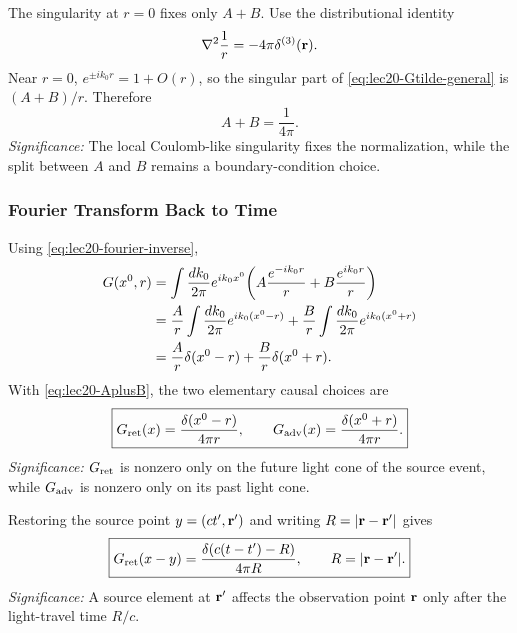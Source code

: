 The singularity at $r=0$ fixes only $A+B$. Use the distributional identity
\begin{equation}\label{eq:lec20-laplacian-one-over-r}
  \nabla^2\frac{1}{r}=-4\pi\delta^{(3)}(\mathbf{r}).
\end{equation}
Near $r=0$, $e^{\pm ik_0r}=1+O(r)$, so the singular part of \eqref{eq:lec20-Gtilde-general} is
$(A+B)/r$. Therefore
\begin{equation}\label{eq:lec20-AplusB}
  \boxed{A+B=\frac{1}{4\pi}.}
\end{equation}
\textit{Significance:} The local Coulomb-like singularity fixes the normalization, while the split between $A$ and $B$ remains a boundary-condition choice.


\subsubsection*{Fourier Transform Back to Time}
Using \eqref{eq:lec20-fourier-inverse},
\begin{align*}
  G(x^0,r)
  &=\int\frac{dk_0}{2\pi}e^{ik_0x^0}
    \qty(A\frac{e^{-ik_0r}}{r}+B\frac{e^{ik_0r}}{r}) \\
  &=\frac{A}{r}\int\frac{dk_0}{2\pi}e^{ik_0(x^0-r)}
    +\frac{B}{r}\int\frac{dk_0}{2\pi}e^{ik_0(x^0+r)} \\
  &=\frac{A}{r}\delta(x^0-r)+\frac{B}{r}\delta(x^0+r).
\end{align*}
With \eqref{eq:lec20-AplusB}, the two elementary causal choices are
\begin{equation}\label{eq:lec20-ret-adv-green}
  \boxed{G_{\rm ret}(x)=\frac{\delta(x^0-r)}{4\pi r},\qquad
  G_{\rm adv}(x)=\frac{\delta(x^0+r)}{4\pi r}.}
\end{equation}
\textit{Significance:} $G_{\rm ret}$ is nonzero only on the future light cone of the source event, while $G_{\rm adv}$ is nonzero only on its past light cone.

Restoring the source point $y=(ct',\mathbf{r}')$ and writing $R=|\mathbf{r}-\mathbf{r}'|$ gives
\begin{equation}\label{eq:lec20-ret-green-restored}
  \boxed{G_{\rm ret}(x-y)=\frac{\delta\qty(c(t-t')-R)}{4\pi R},
  \qquad R=|\mathbf{r}-\mathbf{r}'|.}
\end{equation}
\textit{Significance:} A source element at $\mathbf{r}'$ affects the observation point $\mathbf{r}$ only after the light-travel time $R/c$.

